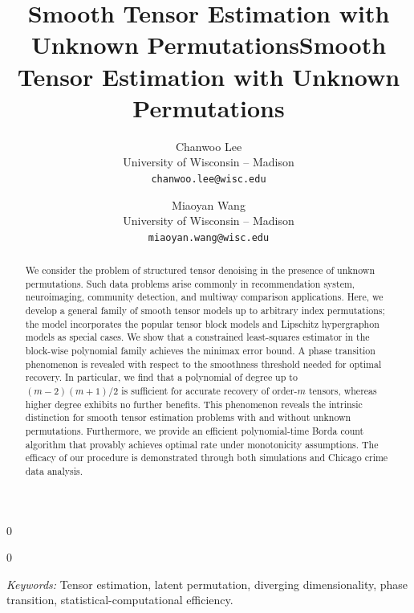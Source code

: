 \documentclass[11pt]{article}
\newcommand{\blind}{0}
\theoremstyle{definition}
\begin{document}
\blind
{ \title{Smooth Tensor Estimation with Unknown Permutations}
 \date{}
\author{%
Chanwoo Lee \\
University of Wisconsin -- Madison\\
\texttt{chanwoo.lee@wisc.edu} \\
\and
Miaoyan Wang \\
University of Wisconsin -- Madison\\
\texttt{miaoyan.wang@wisc.edu} \\
}

    \maketitle
} \fi

\blind
{
 \date{}
  \title{Smooth Tensor Estimation with Unknown Permutations}
\author{}
\maketitle
} \fi

\vspace{-2cm}
\begin{abstract}%
 We consider the problem of structured tensor denoising in the presence of unknown permutations. Such data problems arise commonly in recommendation system, neuroimaging, community detection, and multiway comparison applications. Here, we develop a general family of smooth tensor models up to arbitrary index permutations; the model incorporates the popular tensor block models and Lipschitz hypergraphon models as special cases. We show that a constrained least-squares estimator in the block-wise polynomial family achieves the minimax error bound. A phase transition phenomenon is revealed with respect to the smoothness threshold needed for optimal recovery. In particular, we find that a polynomial of degree up to {\footnotesize $(m-2)(m+1)/2$} is sufficient for accurate recovery of order-$m$ tensors, whereas higher degree exhibits no further benefits. This phenomenon reveals the intrinsic distinction for smooth tensor estimation problems with and without unknown permutations. Furthermore, we provide an efficient polynomial-time Borda count algorithm that provably achieves optimal rate under monotonicity assumptions. The efficacy of our procedure is demonstrated through both simulations and Chicago crime data analysis. 
  \end{abstract}


\noindent%
{\it Keywords:} Tensor estimation, latent permutation, diverging dimensionality, phase transition, statistical-computational efficiency. 
\end{document}
